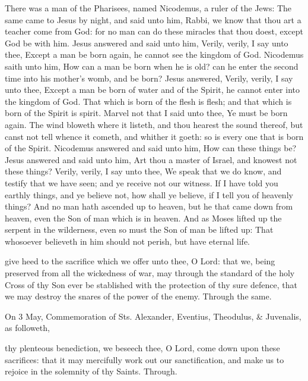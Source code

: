 
 There was a man of the Pharisees, named Nicodemus, a ruler of the Jews: The same came to Jesus by night, and said unto him, Rabbi, we know that thou art a teacher come from God: for no man can do these miracles that thou doest, except God be with him. Jesus answered and said unto him, Verily, verily, I say unto thee, Except a man be born again, he cannot see the kingdom of God. Nicodemus saith unto him, How can a man be born when he is old? can he enter the second time into his mother's womb, and be born? Jesus answered, Verily, verily, I say unto thee, Except a man be born of water and of the Spirit, he cannot enter into the kingdom of God. That which is born of the flesh is flesh; and that which is born of the Spirit is spirit. Marvel not that I said unto thee, Ye must be born again. The wind bloweth where it listeth, and thou hearest the sound thereof, but canst not tell whence it cometh, and whither it goeth: so is every one that is born of the Spirit. Nicodemus answered and said unto him, How can these things be? Jesus answered and said unto him, Art thou a master of Israel, and knowest not these things? Verily, verily, I say unto thee, We speak that we do know, and testify that we have seen; and ye receive not our witness. If I have told you earthly things, and ye believe not, how shall ye believe, if I tell you of heavenly things? And no man hath ascended up to heaven, but he that came down from heaven, even the Son of man which is in heaven. And as Moses lifted up the serpent in the wilderness, even so must the Son of man be lifted up: That whosoever believeth in him should not perish, but have eternal life.


\secret
{} give heed to the sacrifice which we offer unto thee, O Lord: that we, being preserved from all the wickedness of war, may through the standard of the holy Cross of thy Son ever be stablished with the protection of thy sure defence, that we may destroy the snares of the power of the enemy. Through the same.
\begin{rubric}
	 On 3 May, Commemoration of Sts. Alexander, Eventius, Theodulus, \& Juvenalis, as followeth,
\end{rubric}
 thy plenteous benediction, we beseech thee, O Lord, come down upon these sacrifices: that it may mercifully work out our sanctification, and make us to rejoice in the solemnity of thy Saints. Through.


